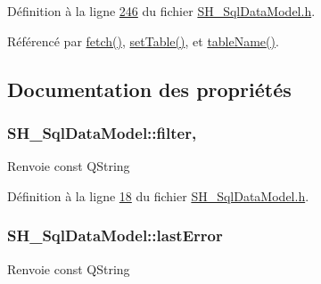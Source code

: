 Définition à la ligne \hyperlink{SH__SqlDataModel_8h_source_l00246}{246} du fichier \hyperlink{SH__SqlDataModel_8h_source}{S\-H\-\_\-\-Sql\-Data\-Model.\-h}.



Référencé par \hyperlink{classSH__SqlDataModel_ab6c206088250a66ddc8cb8d33a38e421}{fetch()}, \hyperlink{classSH__SqlDataModel_a2c09d14926326a1149c1df7856c9879c}{set\-Table()}, et \hyperlink{classSH__SqlDataModel_afced07f7b9e6fecd349a5428a1a4615e}{table\-Name()}.



\subsection{Documentation des propriétés}
\hypertarget{classSH__SqlDataModel_a1f3b35273198f9c67ca4bca5b29876e9}{
\subsubsection[{filter}]{\setlength{\rightskip}{0pt plus 5cm}S\-H\-\_\-\-Sql\-Data\-Model\-::filter\hspace{0.3cm}{\ttfamily [read]}, {\ttfamily [write]}}}\label{classSH__SqlDataModel_a1f3b35273198f9c67ca4bca5b29876e9}
\begin{DoxyReturn}{Renvoie}
const Q\-String 
\end{DoxyReturn}


Définition à la ligne \hyperlink{SH__SqlDataModel_8h_source_l00018}{18} du fichier \hyperlink{SH__SqlDataModel_8h_source}{S\-H\-\_\-\-Sql\-Data\-Model.\-h}.

\hypertarget{classSH__SqlDataModel_a28af51642aee51bc7e0ce19b97c57b60}{
\subsubsection[{last\-Error}]{\setlength{\rightskip}{0pt plus 5cm}S\-H\-\_\-\-Sql\-Data\-Model\-::last\-Error\hspace{0.3cm}{\ttfamily [read]}}}\label{classSH__SqlDataModel_a28af51642aee51bc7e0ce19b97c57b60}
\begin{DoxyReturn}{Renvoie}
const Q\-String 
\end{DoxyReturn}


